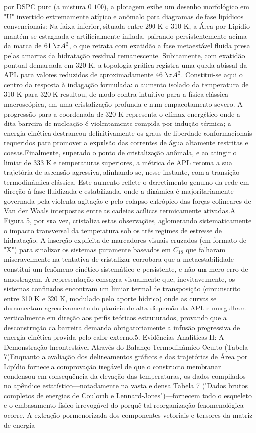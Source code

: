 por DSPC puro (a mistura $0\_100$), a plotagem exibe um desenho morfológico em "U" invertido extremamente atípico e anômalo para diagramas de fase lipídicos convencionais:
Na faixa inferior, situada entre 290 K e 310 K, a Área por Lipídio mantém-se estagnada e artificialmente inflada, pairando persistentemente acima da marca de $61~\AA^2$, o que retrata com exatidão a fase metaestável fluida presa pelas amarras da hidratação residual remanescente. Subitamente, com exatidão pontual demarcada em 320 K, a topologia gráfica registra uma queda abissal da APL para valores reduzidos de aproximadamente $46~\AA^2$. Constitui-se aqui o centro da resposta à indagação formulada: o aumento isolado da temperatura de 310 K para 320 K resultou, de modo contra-intuitivo para a física clássica macroscópica, em uma cristalização profunda e num empacotamento severo. A progressão para a coordenada de 320 K representa o clímax energético onde a dita barreira de nucleação é violentamente rompida por indução térmica; a energia cinética destrancou definitivamente os graus de liberdade conformacionais requeridos para promover a expulsão das correntes de água altamente restritas e coesas.Finalmente, superado o ponto de cristalização anômala, e ao atingir o limiar de 333 K e temperaturas superiores, a métrica de APL retoma a sua trajetória de ascensão agressiva, alinhando-se, nesse instante, com a transição termodinâmica clássica. Este aumento reflete o derretimento genuíno da rede em direção à fase fluidizada e estabilizada, onde a dinâmica é majoritariamente governada pela violenta agitação e pelo colapso entrópico das forças colineares de Van der Waals interpostas entre as cadeias acílicas termicamente ativadas.A Figura 5, por sua vez, cristaliza estas observações, aglomerando sistematicamente o impacto transversal da temperatura sob os três regimes de estresse de hidratação. A inserção explícita de marcadores visuais cruzados (em formato de "X") para sinalizar os sistemas puramente baseados em $C_{18}$ que falharam miseravelmente na tentativa de cristalizar corrobora que a metaestabilidade constitui um fenômeno cinético sistemático e persistente, e não um mero erro de amostragem. A representação consagra visualmente que, inevitavelmente, os sistemas confinados encontram um limiar termal de transposição (circunscrito entre 310 K e 320 K, modulado pelo aporte hídrico) onde as curvas se desconectam agressivamente da planície de alta dispersão da APL e mergulham verticalmente em direção aos perfis teóricos estruturados, provando que a desconstrução da barreira demanda obrigatoriamente a infusão progressiva de energia cinética provida pelo calor externo.5. Evidências Analíticas II: A Demonstração Incontestável Através do Balanço Termodinâmico Oculto (Tabela 7)Enquanto a avaliação dos delineamentos gráficos e das trajetórias de Área por Lipídio fornece a comprovação inegável de que o constructo membranar condensou em consequência da elevação das temperaturas, os dados compilados no apêndice estatístico—notadamente na vasta e densa Tabela 7 ("Dados brutos completos de energias de Coulomb e Lennard-Jones")—fornecem todo o esqueleto e o embasamento físico irrevogável do porquê tal reorganização fenomenológica ocorre. A extração pormenorizada dos componentes vetoriais e tensores da matriz de energia 